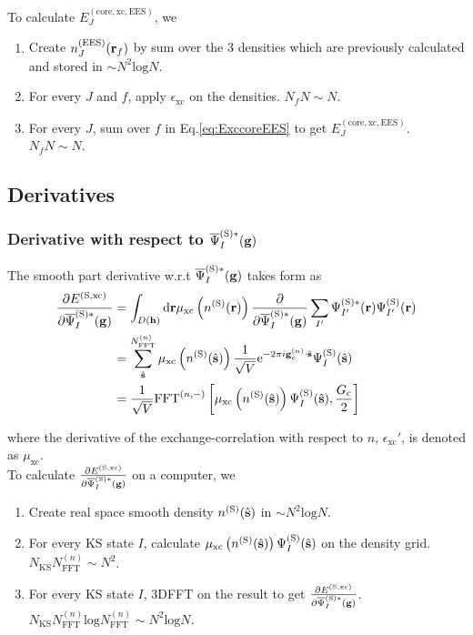 \documentclass[paper=a4, fontsize=11pt]{article} %
\numberwithin{equation}{section} %
\numberwithin{figure}{section} %
\numberwithin{table}{section} %
\newcommand{\p}{\partial}
\newcommand{\bh}{{\bf{h}}}
\newcommand{\bs}{{\bf{s}}}
\newcommand{\bg}{{\bf{g}}}
\newcommand{\br}{{\bf{r}}}
\newcommand{\rS}{{\mathrm{S}}}
\newcommand{\rEES}{{\mathrm{EES}}}
\newcommand{\rxc}{{\mathrm{xc}}}
\newcommand{\rcore}{{\mathrm{core}}}
\newcommand{\re}{{\mathrm{e}}}
\newcommand{\rd}{{\mathrm{d}}}
\newcommand{\rl}{{\mathrm{log}}}
\newcommand{\gcn}{{\bg_c^{(n)}}}
\newcommand{\igcns}{2\pi i\gcn\cdot\hat \bs}
\newcommand{\psigsc}{{\overline \Psi_I^{(\rS)*}(\bg)}}
\newcommand{\NKS}{{N_{\mathrm{KS}}}}
\newcommand{\NFFTn}{{N^{(n)}_{\mathrm{FFT}}}}
\newcommand{\hGc}{{\frac{G_{\mathrm{c}}}{2}}}
\newcommand{\FFTni}{{\mathrm{FFT}^{(n,-)}}}
\begin{document}
To calculate $E_J^{(\rcore,\rxc,\rEES)}$, we
\begin{enumerate}
\item Create $n^{(\rEES)}_J(\br_f)$ by sum over the 3 densities which are previously calculated and stored in $\sim N^2 \rl N$.
\item For every $J$ and $f$, apply $\epsilon_{\rxc}$ on the densities. $N_fN \sim N$. 
\item For every $J$, sum over $f$ in Eq.\eqref{eq:ExccoreEES} to get $E_J^{(\rcore,\rxc,\rEES)}$. $N_fN \sim N$. 
\end{enumerate}


\subsection{Derivatives}
\subsubsection{Derivative with respect to $\psigsc$}
The smooth part derivative w.r.t $\psigsc$ takes form as
\begin{equation}
\begin{split}
\frac{\p E^{(\rS,\rxc)}}{\p \psigsc}
&= \int_{D(\bh)} \rd \br \mu_{\rxc}\left(n^{(\rS)}(\br)\right) \frac{\p }{\p \psigsc} \sum_{I'} \Psi_{I'}^{(\rS)*}(\br)\Psi_{I'}^{(\rS)}(\br) \\
&= \sum_{\hat \bs}^\NFFTn \mu_{\rxc}\left(n^{(\rS)}(\hat \bs)\right)\frac{1}{\sqrt V} \re^{-\igcns} \Psi_{I}^{(\rS)}(\hat \bs) \\
&= \frac{1}{\sqrt V} \FFTni \left[ \mu_{\rxc}\left(n^{(\rS)}(\hat \bs)\right)\Psi_{I}^{(\rS)}(\hat \bs),\hGc \right] \\
\end{split}
\end{equation}

where the derivative of the exchange-correlation with respect to $n$, $\epsilon_{\rxc}'$, is denoted as $\mu_\rxc$.\\

To calculate $\frac{\p E^{(\rS,\rxc)}}{\p \psigsc}$ on a computer, we
\begin{enumerate}
\item Create real space smooth density $n^{(\rS)}(\hat \bs)$ in $\sim N^2 \rl N$.
\item For every KS state $I$, calculate $\mu_{\rxc}\left(n^{(\rS)}(\hat \bs)\right)\Psi_{I}^{(\rS)}(\hat \bs)$ on the density grid. $\NKS \NFFTn \sim N^2$.
\item For every KS state $I$, 3DFFT on the result to get $\frac{\p E^{(\rS,\rxc)}}{\p \psigsc}$. $\NKS \NFFTn \rl \NFFTn \sim N^2 \rl N$.
\end{enumerate}
\end{document}
